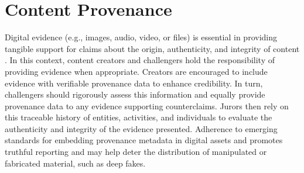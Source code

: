 \documentclass{article}
\begin{document}




    

\section{Content Provenance}
\label{sec:provenance}

Digital evidence (e.g., images, audio, video, or files) is essential in providing tangible support for claims about the origin, authenticity, and integrity of content \cite{taxonomy-of-trust}. In this context, content creators and challengers hold the responsibility of providing evidence when appropriate. Creators are encouraged to include evidence with verifiable provenance data to enhance credibility. In turn, challengers should rigorously assess this information and equally provide provenance data to any evidence supporting counterclaims. Jurors then rely on this traceable history of entities, activities, and individuals to evaluate the authenticity and integrity of the evidence presented. Adherence to emerging standards \cite{c2pa, w3c:prov} for embedding provenance metadata in digital assets and promotes truthful reporting and may help deter the distribution of manipulated or fabricated material, such as deep fakes.
\end{document}
